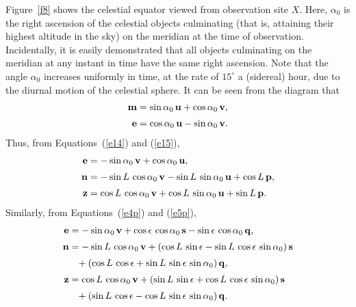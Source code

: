 Figure~\ref{f8} shows the celestial equator viewed from observation site $X$. Here, $\alpha_0$ is
the right ascension of the celestial objects culminating (that is, attaining 
their highest altitude in the sky) on the meridian at the time of observation. Incidentally, it is
easily demonstrated that all objects culminating on the meridian at
any instant in time have the  same right ascension. Note that the angle $\alpha_0$
increases uniformly in time, at the rate of $15^\circ$ a (sidereal) hour, due to the diurnal motion of the celestial
sphere. It can be seen from the diagram that
\begin{align}
{\bf m} &= \sin \alpha_0\,{\bf u} + \cos \alpha_0\,{\bf v},\\[0.5ex]
{\bf e} &=\cos \alpha_0 \,{\bf u} -\sin \alpha_0\,{\bf v}.\label{e17}
\end{align}
Thus, from Equations~(\ref{e14}) and (\ref{e15}),
\begin{align}
{\bf e} &= -\sin \alpha_0\,{\bf v} + \cos \alpha_0\,{\bf u},\\[0.5ex]
{\bf n} &= -\sin L\,\cos \alpha_0\,{\bf v} - \sin L\,\sin \alpha_0\,{\bf u} + \cos L\,{\bf p},\label{xx}\\[0.5ex]
{\bf z} &= \cos L\,\cos \alpha_0\,{\bf v} + \cos L\,\sin \alpha_0\,{\bf u} + \sin L\,{\bf p}.\label{zz}
\end{align}
Similarly, from Equations~(\ref{e4p}) and (\ref{e5p}),
\begin{align}
{\bf e}&= -\sin \alpha_0\,{\bf v} + \cos\epsilon\,\cos \alpha_0\,{\bf s} - \sin\epsilon\,\cos \alpha_0\,{\bf q},\label{e25w}\\[0.5ex]
{\bf n} &= -\sin L\,\cos \alpha_0\,{\bf v} + (\cos L\,\sin \epsilon-\sin L\,\cos \epsilon\,\sin \alpha_0)\,{\bf s}\nonumber\\[0.5ex]
&\phantom{=} + (\cos L\,\cos \epsilon+\sin L\,\sin \epsilon\,\sin \alpha_0)\,{\bf q},\label{e24w}\\[0.5ex]
{\bf z} &= \cos L\,\cos \alpha_0\,{\bf v} + (\sin L\,\sin\epsilon + \cos L\,\cos\epsilon\,\sin \alpha_0)\,{\bf s}\nonumber\\[0.5ex]
&\phantom{=} + (\sin L\,\cos\epsilon-\cos L\,\sin\epsilon\,\sin \alpha_0)\,{\bf q}.\label{e26w}
\end{align}

